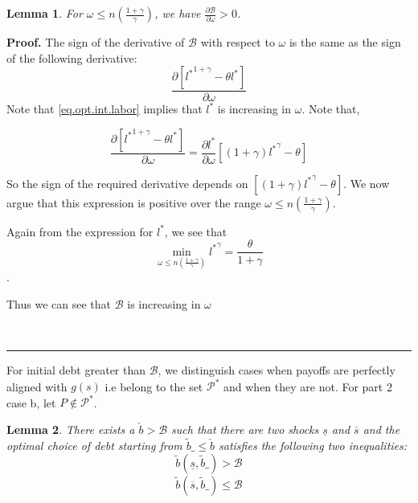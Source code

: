 \documentclass[thmsb,11pt]{article}
\newtheorem{lemma}{Lemma}
\newenvironment{proof}[1][Proof]{\noindent \textbf{#1.} }{\  \rule{0.5em}{0.5em}}
\begin{document}
\begin{lemma}
\label{lem comparative statics of B with omega}
For $\omega\leq n \left(\frac{1+\gamma}{\gamma}\right) $, we have $\frac{\partial \mathcal{B}}{\partial \omega}>0$.
\end{lemma}
\begin{proof}
The sign of the derivative of $\mathcal{B}$ with respect to $\omega$ is the same as the sign of the following derivative:
\[\frac{\partial \left[{l^*}^{1+\gamma}-\theta l^*\right]}{\partial \omega}\]
Note that \eqref{eq.opt.int.labor} implies that $l^*$  is increasing in $\omega$. Note that,

\[\frac{\partial \left[{l^*}^{1+\gamma}-\theta l^*\right]}{\partial \omega}=\frac{\partial l^*}{\partial \omega}\left [ (1+\gamma){l^*}^{\gamma}-\theta\right]\]

So the sign of the required derivative depends on $\left [ (1+\gamma){l^*}^{\gamma}-\theta\right]$. We now argue that this expression is positive over the range $\omega\leq n \left(\frac{1+\gamma}{\gamma}\right)$.


Again from the expression for $l^*$, we see that
\[\min_{\omega \leq n\left(\frac{1+\gamma}{\gamma}\right)}{l^*}^{\gamma}=\frac{\theta}{1+\gamma}\].

Thus we can see that $\mathcal{B}$ is increasing in $\omega$

\end{proof}

For initial debt greater than $\mathcal{B}$, we distinguish cases when payoffs are perfectly aligned with $g(s)$ i.e belong to the set $\mathcal{P}^*$ and when they are not. For part 2 case b, let $P\not \in \mathcal{P}^*$.

\begin{lemma}
\label{lem.limit.in.one.step}
There exists a $\check b>\mathcal{B}$ such that there are two shocks $\underline{s}$ and $\overline{s}$ and the optimal choice of debt starting from $\tilde{b}\_\leq \check b$ satisfies the following two inequalities:
\[\tilde{b}(\underline s,\tilde{b}\_)>\mathcal{B}\]
\[\tilde{b}(\overline s,\tilde{b}\_)\leq \mathcal{B}\]
\end{lemma}
\end{document}
